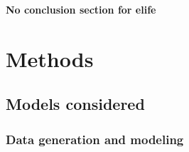 \documentclass[titlepage,12pt] {article}
\begin{document}
\textbf{No conclusion section for elife}


\section*{Methods}

\subsection*{Models considered}

\subsubsection*{Data generation and modeling} 
\end{document}
